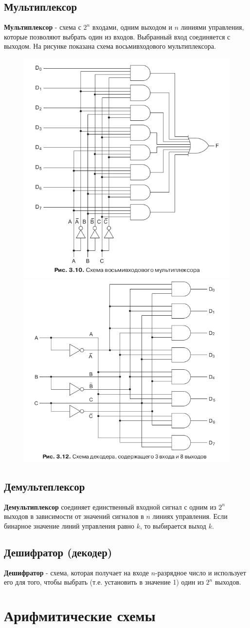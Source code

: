 \documentclass[12pt, a4paper]{article}
\begin{document}
\subsection{Мультиплексор}
\textbf{Мультиплексор} - схема с $2^n$ входами, одним выходом и $n$ линиями управления, которые позволяют выбрать один из входов. Выбранный вход соединяется с выходом. На рисунке показана схема восьмивходового мультиплексора.\\
\begin{figure}[h!]
    \centering
    \includegraphics[width=0.4\linewidth]{./images/3_10.png}
    \includegraphics[width=0.4\linewidth]{./images/3_12.png}
\end{figure}
\subsection{Демультеплексор}
\textbf{Демультиплексор} соединяет единственный входной сигнал с одним из $2^n$ выходов в зависимости от значений сигналов в $n$ линиях управления. Если бинарное значение линий управления равно $k$, то выбирается выход $k$.
\subsection{Дешифратор (декодер)}
\textbf{Дешифратор} - схема, которая получает на входе $n$-разрядное число и использует его для того, чтобы выбрать (т.е. установить в значение 1) один из $2^n$ выходов.
\section{Арифмитические схемы}
\end{document}
